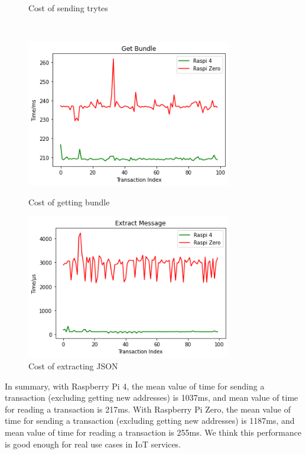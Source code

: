 \begin{figure}[t]
\begin{minipage}[t]{0.45\linewidth}
    \caption{Cost of sending trytes}
    \label{fig:cost_sending_trytes}
\end{minipage}		
\\ [1ex]
\begin{minipage}[t]{0.45\linewidth}
    \centering
    \includegraphics[width=0.8\textwidth]{figs/get_bundle_0.png}
    \caption{Cost of getting bundle}
    \label{fig:cost_getting_bundle}
    \end{minipage}
    \hfill
\begin{minipage}[t]{0.45\linewidth}
    \centering
    \includegraphics[width=0.8\textwidth]{figs/extract_message_0.png}
    \caption{Cost of extracting JSON}
    \label{fig:cost_extracting_json}
\end{minipage}
\end{figure}

In summary, with Raspberry Pi 4, the mean value of time for sending a transaction (excluding getting new addresses) is 1037ms, and mean value of time for reading a transaction is 217ms. 
With Raspberry Pi Zero, the mean value of time for sending a transaction (excluding getting new addresses) is 1187ms, and mean value of time for reading a transaction is 255ms. 
We think this performance is good enough for real use cases in IoT services.

